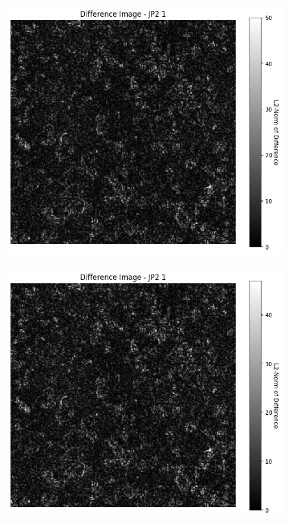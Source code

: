 \begin{figure}[htb]
\begin{subfigure}[b]{0.48\textwidth}
        \caption{}
        \label{fig:img_quality_comp_jp2_1_center_histo}
    \end{subfigure}
    \\
    \begin{subfigure}[b]{0.48\textwidth}
        \centering
        \includegraphics[width=\textwidth]{doc/thesis/0_figures/compare_quality/set1/jp2_1_center_diff_heatmap.png}
        \caption{}
        \label{fig:img_quality_comp_jp2_1_center_diff}
    \end{subfigure}
    \begin{subfigure}[b]{0.48\textwidth}
        \centering
        \includegraphics[width=\textwidth]{doc/thesis/0_figures/compare_quality/set1/jp2_1_center_diff_heatmap_rel.png}

\end{subfigure}
\end{figure}
